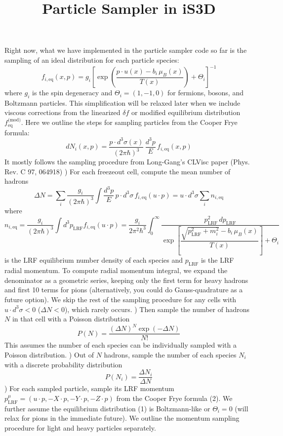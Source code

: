 \documentclass[10.5pt,aps,prd,superscriptaddress]{revtex4}
\newcommand{\be}{\begin{equation}}
\newcommand{\ee}{\end{equation}}
\newcommand{\eq}{\text{eq}}
\newcommand{\nn}{\newline\newline}
\begin{document}
\title{Particle Sampler in iS3D}
\maketitle
Right now, what we have implemented in the particle sampler code so far is the sampling of an ideal distribution for each particle species:
\be
 f_{i,\mathrm{eq}}(x,p) = g_i \left[\exp\left(\frac{p \cdot u(x) - b_i \,\mu_B(x)}{T(x)}\right) + \Theta_i\right]^{-1}
\ee
%
where $g_i$ is the spin degeneracy and $\Theta_i = (1,-1,0)$ for fermions, bosons, and Boltzmann particles. This simplification will be relaxed later when we include viscous corrections from the linearized $\delta f$ or modified equilibrium distribution $f_{\eq}^{\text{(mod)}}$. 
\nn
Here we outline the steps for sampling particles from the Cooper Frye formula:
\be
\label{eq1}
  dN_i(x,p) = \frac{p \cdot d^3\sigma(x)}{(2\pi\hbar)^3} \, \frac{d^3p}{E} \, f_{i,\eq}(x,p) 
\ee
It mostly follows the sampling procedure from Long-Gang's CLVisc paper (Phys. Rev. C 97, 064918)
\nn
\nn
1) For each freezeout cell, compute the mean number of hadrons 
\newline
\be 
\Delta N = \sum_i \frac{g_i}{(2\pi\hbar)^3}\int \frac{d^3p}{E} \, p \cdot d^3\sigma \, f_{i,\eq}(u\cdot p)  = u \cdot d^3\sigma \sum_i n_{i,\eq}
\ee
where 
\be
n_{i,\eq} = \frac{g_i}{(2\pi\hbar)^3} \int d^3p_{\text{LRF}} f_{i,\eq}(u\cdot p) = \frac{g_i}{2\pi^2\hbar^3} \int_0^\infty  \frac{p^2_{\text{LRF}} \,  dp_{\text{LRF}} }{\exp\left[\dfrac{\sqrt{p^2_{\text{LRF}} + m_i^2}- b_i \,\mu_B(x)}{T(x)}\right] + \Theta_i}
\ee
is the LRF equilibrium number density of each species and $p_{\text{LRF}}$ is the LRF radial momentum. To compute radial momentum integral, we expand the denominator as a geometric series, keeping only the first term for heavy hadrons and first 10 terms for pions (alternatively, you could do Gauss-quadrature as a future option).
\nn
We skip the rest of the sampling procedure for any cells with $u \cdot d^3\sigma < 0$ ($\Delta N < 0$), which rarely occurs. 
\nn
\nn
2) Then sample the number of hadrons $N$ in that cell with a Poisson distribution
\newline
\be
P(N) =  \frac{(\Delta N)^{N}\exp(-\Delta N)}{N!}
\ee
This assumes the number of each species can be individually sampled with a Poisson distribution.
\nn
\nn
3) Out of $N$ hadrons, sample the number of each species $N_i$ with a discrete probability distribution
\newline
\be
P(N_i) =\frac{\Delta N_i}{\Delta N}
\ee 
\nn
\nn
4) For each sampled particle, sample its LRF momentum $p^\mu_{\text{LRF}} = (u\cdot p, -X \cdot p, - Y \cdot p, - Z \cdot p)$ from the Cooper Frye formula (2). We further assume the equilibrium distribution (1) is Boltzmann-like or $\Theta_i = 0$ (will relax for pions in the immediate future). We outline the momentum sampling procedure for light and heavy particles separately.
\end{document}
